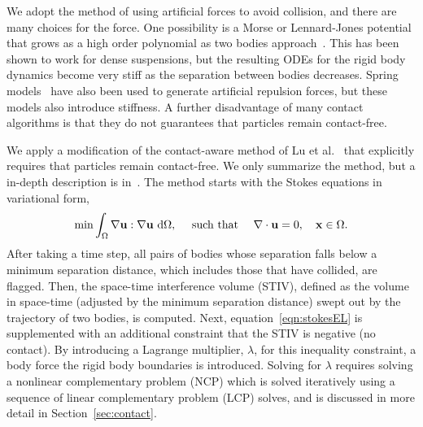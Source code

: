 \documentclass[preprint, 10pt]{elsarticle}
\begin{document}


We adopt the method of using artificial forces to avoid collision, and
there are many choices for the force. One possibility is a Morse or
Lennard-Jones potential that grows as a high order polynomial as two
bodies approach~\cite{Flormann2017, Liu2006}. This has been shown to
work for dense suspensions, but the resulting ODEs for the rigid body
dynamics become very stiff as the separation between bodies decreases.
Spring models~\cite{Tsubota2006, Zhao2013, Kabacogulu2017} have also
been used to generate artificial repulsion forces, but these models also
introduce stiffness. A further disadvantage of many contact algorithms
is that they do not guarantees that particles remain contact-free.

We apply a modification of the contact-aware method of Lu et
al.~\cite{Lu2017} that explicitly requires that particles remain
contact-free. We only summarize the method, but a
in-depth description is in~\cite{Lu2017}.  The method starts with the
Stokes equations in variational form,
\begin{align}
  \min \int_{\Omega} \nabla{\mathbf{u}}:\nabla{\mathbf{u}}~\text{d}\Omega,
  \quad\text{ such that }\quad \nabla\cdot{\mathbf{u}} = 0, 
  \quad {\mathbf{x}} \in \Omega.
  \label{eqn:stokesEL}
\end{align} 
After taking a time step, all pairs of bodies whose separation falls
below a minimum separation distance, which includes those that have
collided, are flagged.  Then, the space-time interference volume (STIV),
defined as the volume in space-time (adjusted by the minimum separation
distance) swept out by the trajectory of two bodies, is computed.  Next,
equation~\eqref{eqn:stokesEL} is supplemented with an additional
constraint that the STIV is negative (no contact).  By introducing a
Lagrange multiplier, $\lambda$, for this inequality constraint, a body
force the rigid body boundaries is introduced.   Solving for $\lambda$
requires solving a nonlinear complementary problem (NCP) which is solved
iteratively using a sequence of linear complementary problem (LCP)
solves, and is discussed in more detail in Section~\ref{sec:contact}.
\end{document}
